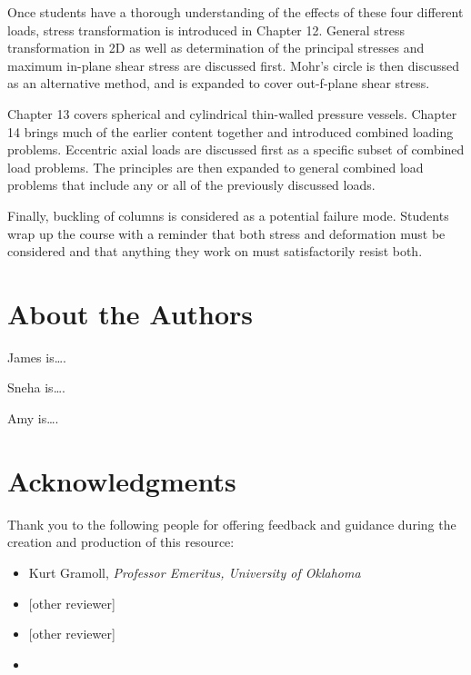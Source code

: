 \documentclass[
  letterpaper,
  DIV=11,
  numbers=noendperiod]{scrreprt}
\theoremstyle{definition}
\theoremstyle{remark}
\begin{document}
Once students have a thorough understanding of the effects of these four
different loads, stress transformation is introduced in Chapter 12.
General stress transformation in 2D as well as determination of the
principal stresses and maximum in-plane shear stress are discussed
first. Mohr's circle is then discussed as an alternative method, and is
expanded to cover out-f-plane shear stress.

Chapter 13 covers spherical and cylindrical thin-walled pressure
vessels. Chapter 14 brings much of the earlier content together and
introduced combined loading problems. Eccentric axial loads are
discussed first as a specific subset of combined load problems. The
principles are then expanded to general combined load problems that
include any or all of the previously discussed loads.

Finally, buckling of columns is considered as a potential failure mode.
Students wrap up the course with a reminder that both stress and
deformation must be considered and that anything they work on must
satisfactorily resist both.

\section*{About the Authors}\label{about-the-authors}


James is\ldots.

Sneha is\ldots.

Amy is\ldots.

\section*{Acknowledgments}\label{acknowledgments}


Thank you to the following people for offering feedback and guidance
during the creation and production of this resource:

\begin{itemize}
\item
  Kurt Gramoll, \emph{Professor Emeritus, University of Oklahoma}
\item
  {[}other reviewer{]}
\item
  {[}other reviewer{]}
\item
\end{itemize}
\end{document}

